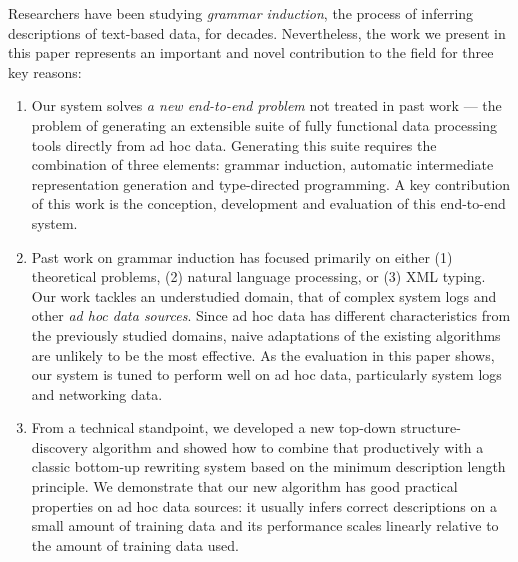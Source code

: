 Researchers have been studying {\em grammar induction}, the process of
inferring descriptions of text-based data, for decades.  Nevertheless,
the work we present in this paper represents an important and novel 
contribution to the field for three key reasons:

\begin{enumerate}
\item Our system solves {\em a new end-to-end problem} not treated in
past work --- the problem of generating an extensible suite of fully
functional data processing tools directly from ad hoc data.  
Generating this suite requires the combination of three elements:
grammar induction, automatic intermediate representation generation
and type-directed programming.  A key contribution of this work is the
conception, development and evaluation of this end-to-end system.


\item Past work on grammar induction has focused primarily on
either (1) theoretical problems, (2) natural language processing, or
(3) XML typing.  Our work tackles an understudied domain, that of complex system
logs and other {\em ad hoc data sources}.  Since ad hoc data has
different characteristics from the previously studied domains, naive
adaptations of the existing algorithms are unlikely to be the most
effective.  As the evaluation in this paper shows, our system is tuned
to perform well on ad hoc data, particularly system logs and
networking data.  

\item  From a technical standpoint, we developed a new top-down 
structure-discovery algorithm and showed how to combine that 
productively with a classic bottom-up rewriting system based on 
the minimum description length principle. We demonstrate that our
new algorithm has good practical properties on ad hoc data sources:  
it usually infers correct descriptions on a small amount of training
data and its performance scales linearly relative to the amount of training
data used.
\end{enumerate}

